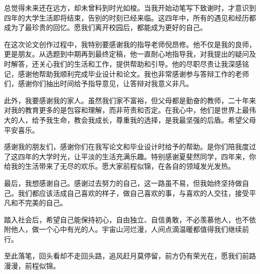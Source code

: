 
\begin{acknowledgements}
总觉得未来还在远方，却未曾料到时光如梭。当我开始动笔写下致谢时，才意识到四年的大学生活即将结束，告别的时刻已经来临。这四年中，所有的遇见和经历都成为了最珍贵的回忆。愿我们离开校园后，都能成为更好的自己。

在这次论文创作过程中，我特别要感谢我的指导老师倪昂修。他不仅是我的良师，更是朋友。从选题到中期再到最终定稿，他一直耐心地指导我，对我提出的疑问及时解答，还关心我们的生活和工作，提供帮助和引导。他的尽职尽责让我深感铭记，感谢他帮助我顺利完成毕业设计和论文。我也非常感谢参与答辩工作的老师们，感谢你们抽出时间给予指导意见，让答辩对我意义非凡。

此外，我要感谢我的家人。虽然我们家不富裕，但父母都是勤奋的教师，二十年来对我的教育更多的是包容和理解，而非苛责和否定。在我心中，他们是世界上最伟大的人，给予我生命，教会我成长，尊重我的选择，是我最坚强的后盾。希望父母平安喜乐。

感谢我的朋友们，感谢你们在我写论文和毕业设计时给予的帮助。是你们陪我度过了这四年的大学时光，让平淡的生活充满乐趣。特别感谢夏斐然同学，四年来，你给我的生活带来了无尽的欢乐。愿大家前程似锦，在各自的领域发光发热。

最后，我想感谢自己。感谢过去努力的自己，这一路虽不易，但我始终坚持做自己。我们都应该活成自己喜欢的样子，做自己喜欢的事，与喜欢的人交往，接受平凡和不完美的自己。

踏入社会后，希望自己能保持初心，自由独立、自信勇敢，不必羡慕他人，也不依附他人，做一个心中有光的人。宇宙山河烂漫，人间点滴温暖都值得我们继续前行。

至此落笔，回头看却不走回头路，追风赶月莫停留，前方仍有荣光在，愿我们前路漫漫，前程似锦。
\end{acknowledgements}
